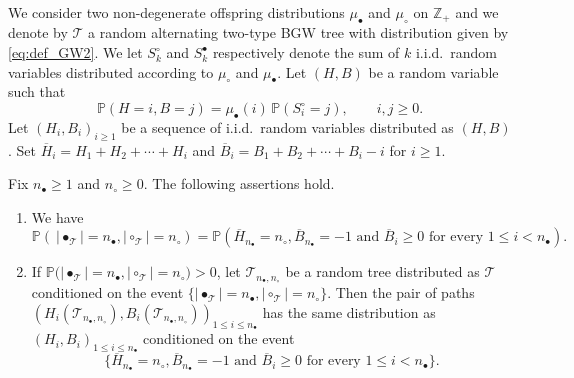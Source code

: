 \documentclass[10pt]{amsart}
\theoremstyle{definition}\newtheorem{defi}[theo]{Definition}\newtheorem{rema}[theo]{Remark}\newtheorem{exam}[theo]{Example}\newtheorem{exem}[theo]{Example}\newtheorem{nota}[theo]{Notation}
\providecommand{\abs}[1]{\lvert#1\rvert}
\newcommand{\Z}{\mathbb{Z}}
\def\mub{\mu_{\bullet}}
\def\muc{\mu_{\circ}}
\def\nc{n_{\circ}}
\def\nb{n_{\bullet}}
\def\oB{\overline{B}}
\def\oH{\overline{H}}
\def\Ts{\mathscr{T}}
\renewcommand\Pr[1]{\mathbb{P}\left(#1\right)}
\newcommand\Prb[1]{\mathbb{P}\big(#1\big)}
\begin{document}
 We consider two non-degenerate offspring distributions $\mub$ and $\muc$ on $\Z_{+}$ and we denote by $\Ts$ a random alternating two-type BGW tree with distribution given by \eqref{eq:def_GW2}. We let $S^{\circ}_{k}$ and $S^{\bullet}_{k}$ respectively denote the sum of $k$ i.i.d.\ random variables distributed according to $\muc$ and $\mub$.
 Let $(H,B)$ be a random variable such that
 \begin{equation}
    \Pr{H=i,B=j}=\mub(i) \, \Pr{S^{\circ}_{i}=j}, \qquad  i, j \geq 0.
    \label{eq:HB}
  \end{equation}
Let $(H_{i},B_{i})_{i \geq 1}$ be a sequence of i.i.d.\ random variables distributed as $(H,B)$. Set $\oH_{i}=H_{1}+H_{2}+ \cdots+H_{i}$ and  $\oB_{i}=B_{1}+B_{2}+ \cdots+B_{i}-i$ for $i \geq 1$.

\begin{lemma}\label{lem:codeRW} Fix $\nb \geq 1$ and $\nc \geq 0$. The following assertions hold.
\begin{enumerate}
\item[(i)]We have \[\Pr{\ \abs{\bullet_{\Ts}} =\nb,\abs{\circ_{\Ts}}=\nc}=\Pr{\oH_{\nb}=\nc,\oB_{\nb}=-1 \textrm{ and } \oB_{i} \geq 0 \textrm{ for every } 1 \leq i < \nb}.\]
\item[(ii)] If $\Prb{ \abs{\bullet_{\Ts}} =\nb,\abs{\circ_{\Ts}}=\nc}>0$, let $\Ts_{\nb,\nc}$ be a random tree distributed as $\Ts$ conditioned on the event $\{ \abs{\bullet_{\Ts}} =\nb,\abs{\circ_{\Ts}}=\nc \}$. Then the pair of paths $(H_{i}(\Ts_{\nb,\nc}) ,B_{i}(\Ts_{\nb,\nc}))_{1 \leq i \leq \nb}$ has the same distribution as $(H_{i},B_{i})_{1 \leq i \leq \nb}$ conditioned on the event
  \[\{\oH_{\nb}=\nc,\oB_{\nb}=-1 \textrm{ and } \oB_{i} \geq 0 \textrm{ for every } 1 \leq i < \nb\}.\]
\end{enumerate}
\end{lemma}
\end{document}
